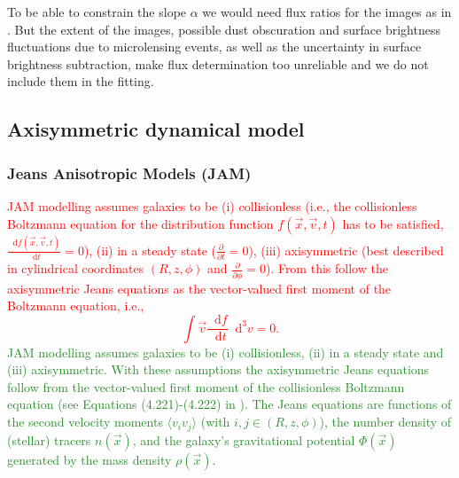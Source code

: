 \documentclass[useAMS,usenatbib]{mnras}
\newcommand*\diff{\mathop{}\!\mathrm{d}}
\newcommand*\Diff[1]{\mathop{}\!\mathrm{d^#1}}
\newcommand{\vect}[1]{\vec{#1}} %
\newcommand{\NEW}[1]{\textcolor{ForestGreen}{#1}}
\newcommand{\OLD}[1]{\textcolor{Red}{#1}}
\begin{document}
To be able to constrain the slope $\alpha$ we would need flux ratios for the images as in \citet{GlennEC}. But the extent of the images, possible dust obscuration and surface brightness fluctuations due to microlensing events, as well as the uncertainty in surface brightness subtraction, make flux determination too unreliable and we do not include them in the fitting.

\subsection{Axisymmetric dynamical model} \label{sec:model_JAM}

\subsubsection{Jeans Anisotropic Models (JAM)} \label{sec:model_JAM_JAM}

\OLD{JAM modelling assumes galaxies to be (i) collisionless (i.e., the collisionless Boltzmann equation for the distribution function $f(\vect{x},\vect{v},t)$ has to be satisfied, $\frac{\diff f(\vect{x},\vect{v},t)}{\diff t} = 0$), (ii) in a steady state ($\frac{\partial}{\partial t} = 0$), (iii) axisymmetric (best described in cylindrical coordinates $(R,z,\phi)$ and $\frac{\partial}{\partial \phi} = 0$). From this follow the axisymmetric Jeans equations as the vector-valued first moment of the Boltzmann equation, i.e.,
\begin{equation*}
\int \vect{v} \frac{\diff f}{\diff t} \Diff3 v = 0.
\end{equation*}}
\NEW{JAM modelling assumes galaxies to be (i) collisionless, (ii) in a steady state and (iii) axisymmetric. With these assumptions the axisymmetric Jeans equations follow from the vector-valued first moment of the collisionless Boltzmann equation (see Equations (4.221)-(4.222) in \citet{2008gady.book.....B}). The Jeans equations are functions of the second velocity moments $\langle v_i v_j\rangle$ (with $i,j\in(R,z,\phi)$), the number density of (stellar) tracers $n(\vect{x})$, and the galaxy's gravitational potential $\Phi(\vect{x})$ generated by the mass density $\rho(\vect{x})$.} 
\end{document}
